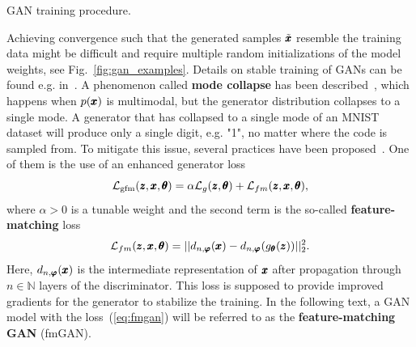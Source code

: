 \begin{algorithm}

\caption{GAN training procedure.}
\label{alg:gan_train}
\end{algorithm}

Achieving convergence such that the generated samples $\tilde{\pmb{{x}}}$ resemble the training data might be difficult and require multiple random initializations of the model weights, see Fig.~\ref{fig:gan_examples}. Details on stable training of GANs can be found e.g. in~\cite{gui2021review}. A phenomenon called \textbf{mode collapse} has been described~\cite{goodfellow2016nips}, which happens when $p(\pmb{{x}})$ is multimodal, but the generator distribution collapses to a single mode. A generator that has collapsed to a single mode of an MNIST dataset will produce only a single digit, e.g. "1", no matter where the code is sampled from. To mitigate this issue, several practices have been proposed~\cite{salimans2016fmgan,hong2019generative}. One of them is the use of an enhanced generator loss
\begin{equation} \label{eq:fmgan}
\mathcal{L}_{\text{gfm}}(\pmb{{z}},\pmb{{x}},\pmb{{\theta}})=\alpha\mathcal{L}_{g}(\pmb{{z}},\pmb{{\theta}})+\mathcal{L}_{fm}(\pmb{{z}},\pmb{{x}},\pmb{{\theta}}),
\end{equation}
where $\alpha > 0$ is a tunable weight and the second term is the so-called \textbf{feature-matching} loss
\begin{equation} \label{eq:fm_loss}
\mathcal{L}_{fm}(\pmb{{z}},\pmb{{x}},\pmb{{\theta}}) = ||d_{n,\pmb{{\varphi}}}(\pmb{{x}})-d_{n,\pmb{{\varphi}}}(g_{\pmb{{\theta}}}(\pmb{{z}}))||_{2}^{2}.
\end{equation}
Here, $d_{n,\pmb{{\varphi}}}(\pmb{{x}})$ is the intermediate representation of $\pmb{{x}}$ after propagation through $n \in \mathbb{N}$ layers of the discriminator. This loss is supposed to provide improved gradients for the generator to stabilize the training. In the following text, a GAN model with the loss~(\ref{eq:fmgan}) will be referred to as the \textbf{feature-matching GAN} (fmGAN).

